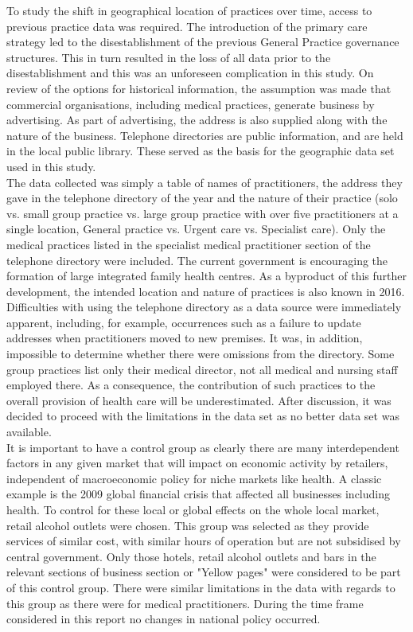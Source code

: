 \documentclass[11pt,a4paper]{article}
\begin{document}
To study the shift in geographical location of practices over time, access to previous practice data was required. The introduction of the primary care strategy led to the disestablishment of the previous General Practice governance structures. This in turn resulted in the loss of all data prior to the disestablishment and this was an unforeseen complication in this study. On review of the options for historical information, the assumption was made that commercial organisations, including medical practices, generate business by advertising. As part of advertising, the address is also supplied along with the nature of the business. Telephone directories are public information, and are held in the local public library. These served as the basis for the geographic data set used in this study.\\


The data collected was simply a table of names of practitioners, the address they gave in the telephone directory of the year and the nature of their practice (solo vs. small group practice vs. large group practice with over five practitioners at a single location, General practice vs. Urgent care vs. Specialist care). Only the medical practices listed in the specialist medical practitioner section of the telephone directory were included. The current government is encouraging the formation of large integrated family health centres. As a byproduct of this further development, the intended location and nature of practices is also known in 2016.\\


Difficulties with using the telephone directory as a data source were immediately apparent, including, for example, occurrences such as a failure to update addresses when practitioners moved to new premises. It was, in addition,  impossible to determine whether there were omissions from the directory. Some group practices list only their medical director, not all medical and nursing staff employed there. As a consequence, the contribution of such practices to the overall provision of health care will be  underestimated.  After discussion, it was decided to proceed with the limitations in the data set as no better data set was available.\\


It is important to have a control group as clearly there are many interdependent factors in any given market that will impact on economic activity by retailers, independent of macroeconomic policy for niche markets like health. A classic example is the 2009 global financial crisis that affected all businesses including health. To control for these local or global effects on the whole local market, retail alcohol outlets were chosen.  This group was selected as they provide services of similar cost, with similar hours of operation but are not subsidised by central government. Only those hotels, retail alcohol outlets and bars in the relevant sections of business section or "Yellow pages" were considered to be part of this control group. There were similar limitations in the data with regards to this group as there were for medical practitioners. During the time frame considered in this report no changes in national policy occurred.\\
\end{document}
